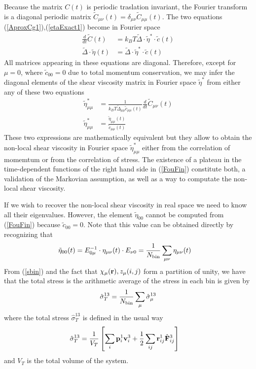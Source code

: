 \documentclass[a4paper,openright,12pt]{book}
\newcommand{\esc}{\!\cdot\!}
\begin{document}
Because  the  matrix  $C(t)$  is periodic  traslation  invariant,  the
Fourier     transform     is     a    diagonal     periodic     matrix
$\tilde{C}_{\mu\nu}(t)=\delta_{\mu\nu}\tilde{C}_{\mu\mu}(t)$.
The two equations (\ref{AproxCg1}),(\ref{etaExact1}) become in Fourier space
\begin{align}
  \frac{d}{dt}\tilde{C}(t)&=  k_BT\tilde{\Delta}\esc \tilde{\eta}^*\esc \tilde{c}(t)
\nonumber\\
 \tilde{\Delta}\esc \tilde{\eta}(t) &=\tilde{\Delta}\esc \tilde{\eta}^*\esc \tilde{c}(t)
\label{Fou1}
\end{align}
All matrices  appearing in  these equations are  diagonal.  Therefore,
except  for $\mu=0$,  where $\tilde{c}_{00}=0$  due to  total momentum
conservation,  we  may  infer  the  diagonal  elements  of  the  shear
viscosity matrix in Fourier space  $\tilde{\eta}^*$ from either any of
these two equations
\begin{align}
  \tilde{\eta}^*_{\mu\mu}&= \frac{1}{ k_BT\tilde{\Delta}_{\mu\mu}  \tilde{c}_{\mu\mu}(t)}\frac{d}{dt}\tilde{C}_{\mu\nu}(t)
\nonumber\\
\tilde{\eta}_{\mu\mu}^*&=\frac{\tilde{\eta}_{\mu\mu}(t) }{\tilde{c}_{\mu\mu}(t)}
\label{FouFin}
\end{align}
These two expressions are mathematically  equivalent but they allow to
obtain   the    non-local   shear    viscosity   in    Fourier   space
$\tilde{\eta}_{\mu\mu}^*$ either  from the correlation of  momemtum or
from the  correlation of stress.   The existence  of a plateau  in the
time-dependent  functions of  the  right hand  side in  (\ref{FouFin})
constitute both, a validation of  the Markovian assumption, as well as
a way to computate the non-local shear viscosity.

If we wish  to recover the non-local shear viscosity  in real space we
need   to  know   all   their  eigenvalues.    However,  the   element
$\tilde{\eta}_{00}$  cannot be  computed  from (\ref{FouFin})  because
$\tilde{c}_{00}=0$.  Note that this value  can be obtained directly by
recognizing that
\begin{align}
    \tilde{\eta}_{00}(t)&=E_{0\mu}^{-1}\cdot\eta_{\mu\nu}(t)\cdot E_{\nu 0}=\frac{1}{N_{\rm bin}}
\sum_{\mu\nu}\eta_{\mu\nu}(t)
\label{eta00}
\end{align}
From
(\ref{sbin}) and the fact that $\chi_\mu({\bf r}),z_{\mu}(i,j)$ form a partition of unity, we have
that the total stress is the arithmetic average of the stress in each bin is given by
\begin{align}
\hat{\sigma}_T^{13}=\frac{1}{N_{\rm bin}}\sum_\mu\hat{\sigma}_\mu^{13}
\label{TotStress2}
\end{align}
where the  total stress $\hat\sigma_T^{13}$ is defined  in the usual way
\begin{align}
\hat{\sigma}_T^{13}&=\frac{1}{V_T}\left[\sum_{i}{\bf p}^1_i{\bf v}^3_i
+\frac{1}{2}\sum_{ij}{\bf r}^1_{ij}\hat{\bf F}^3_{ij}\right]
\label{TotStress}
\end{align}
and $V_T$ is the total volume of the system. 
\end{document}

